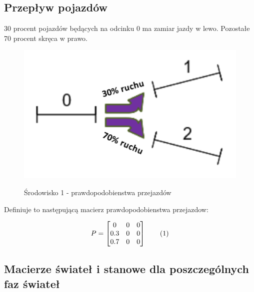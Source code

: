\documentclass[12pt]{book}
\theoremstyle{plain}
\newcommand\addtag{\refstepcounter{equation}
	\renewcommand{\labelenumii}{\theenumii}
	\renewcommand{\theenumii}{\theenumi.\arabic{enumii}.}
	\tag{\theequation}}
\begin{document}
	\subsection{Przepływ pojazdów}
	30 procent pojazdów będących na odcinku 0 ma zamiar jazdy w lewo. Pozostałe 70 procent skręca w prawo. 
	\begin{figure}[H]
		\centering
		\includegraphics[width=14cm]{images/env_1_ruch}
		\label{fig:env_1_ruch}
		\caption{Środowisko 1 - prawdopodobienstwa przejazdów}
	\end{figure}
	
	Definiuje to następującą macierz prawdopodobienstwa przejazdow:
	\def \P {\begin{bmatrix}
			0 & 0 & 0 \\
			0.3 & 0 & 0 \\
			0.7 & 0 & 0 \\
	\end{bmatrix}}
	
	\[
	P=\P \addtag
	\]
	
	
	\subsection{Macierze świateł i stanowe dla poszczególnych faz świateł}
	
\end{document}
